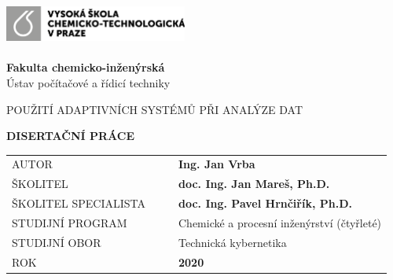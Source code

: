 \cleardoublepage
\thispagestyle{empty}
\noindent
\includegraphics[width=0.45\textwidth]{IMG/TOP/logoVSCHT_zakl_CB.png} \\
\vspace{10mm}
\\
{\Large \textbf{Fakulta  chemicko-inženýrská}
\\ [5mm]
Ústav počítačové a řídicí techniky}

\vspace{30mm}


\begin{spacing}{0.9}
\Huge\noindent POUŽITÍ ADAPTIVNÍCH SYSTÉMŮ PŘI ANALÝZE DAT\\ 
\end{spacing}
\vspace{20mm}

\noindent
{\Large \textbf{DISERTAČNÍ PRÁCE}} 

\vspace{10mm}

\begin{table}[!h]
\begin{tabular}{  l l |l  l }
\hspace{-0.5em}AUTOR & \hspace{0mm} & & {\Large \textbf{Ing. Jan Vrba}} \\ [5mm]
\hspace{-0.5em}ŠKOLITEL &  &  & \textbf{\large doc. Ing. Jan Mareš, Ph.D.}\\ [5mm]
\hspace{-0.5em}ŠKOLITEL  SPECIALISTA             &     &   & {\textbf{\large doc. Ing. Pavel Hrnčiřík, Ph.D. }} \\ [5mm]
\hspace{-0.5em}STUDIJNÍ PROGRAM &  &  & {\large Chemické a procesní inženýrství (čtyřleté)} \\ [5mm]
\hspace{-0.5em}STUDIJNÍ OBOR    & &   & {\large Technická kybernetika}\\ [5mm]
\hspace{-0.5em}ROK          &       &   & \textbf{2020} 
\end{tabular}


\end{table}

